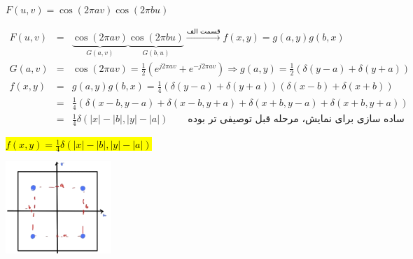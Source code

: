 \begin{qsolve}
	\begin{latin}
		\textbullet $F(u,v)=\cos(2\pi av)\cos(2\pi bu)$
	\end{latin}
	\begin{qsolve}[]
		\begin{eqnarray*}
			F(u,v)&=&\underbrace{\cos(2\pi av)}_{G(a,v)}\underbrace{\cos(2\pi bu)}_{G(b,u)}
			\xrightarrow{\text{قسمت الف}}f(x,y)=g(a,y)g(b,x)\\
			G(a,v)&=&\cos(2\pi av)=\frac{1}{2}\left(e^{j2\pi av}+e^{-j2\pi av}\right)
			\Rightarrow g(a,y)=\frac{1}{2}\left(\delta(y-a)+\delta(y+a)\right)\\
			f(x,y)&=&g(a,y)g(b,x)=\frac{1}{4}\left(\delta(y-a)+\delta(y+a)\right)\left(\delta(x-b)+\delta(x+b)\right)\\
			&=&\frac{1}{4}\left(\delta(x-b,y-a)+\delta(x-b,y+a)+\delta(x+b,y-a)+\delta(x+b,y+a)\right)\\
			&=&\frac{1}{4}\delta\left(|x|-|b|,|y|-|a|\right)\qquad\text{ساده سازی برای نمایش، مرحله قبل توصیفی تر بوده}
		\end{eqnarray*}
		\centerline{\hl{$f(x,y)=\frac{1}{4}\delta\left(|x|-|b|,|y|-|a|\right)$}}
        \begin{center}
			\includegraphics[width=4cm]{pics/q4_2_4.png}
		\end{center}
	\end{qsolve}
\end{qsolve}